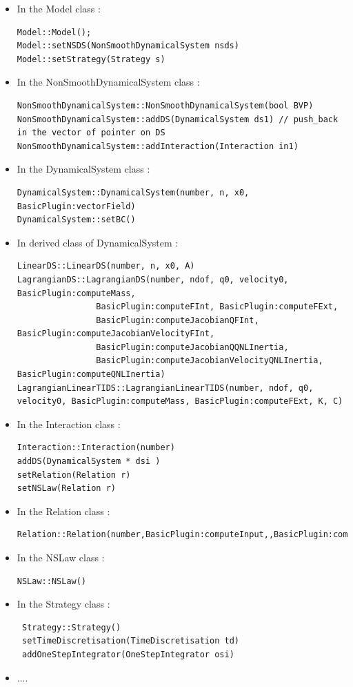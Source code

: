  \begin{itemize}
 \item In the Model class :
\begin{verbatim}
Model::Model();
Model::setNSDS(NonSmoothDynamicalSystem nsds)
Model::setStrategy(Strategy s)
\end{verbatim}
 \item In the NonSmoothDynamicalSystem class :
\begin{verbatim}
NonSmoothDynamicalSystem::NonSmoothDynamicalSystem(bool BVP)
NonSmoothDynamicalSystem::addDS(DynamicalSystem ds1) // push_back in the vector of pointer on DS
NonSmoothDynamicalSystem::addInteraction(Interaction in1) 
\end{verbatim}  
 \item In the DynamicalSystem class :
\begin{verbatim}
DynamicalSystem::DynamicalSystem(number, n, x0, BasicPlugin:vectorField)
DynamicalSystem::setBC()
\end{verbatim}
 \item In derived class of DynamicalSystem :
\begin{verbatim}
LinearDS::LinearDS(number, n, x0, A)
LagrangianDS::LagrangianDS(number, ndof, q0, velocity0, BasicPlugin:computeMass,
                BasicPlugin:computeFInt, BasicPlugin:computeFExt,
                BasicPlugin:computeJacobianQFInt, BasicPlugin:computeJacobianVelocityFInt,
                BasicPlugin:computeJacobianQQNLInertia,
                BasicPlugin:computeJacobianVelocityQNLInertia, BasicPlugin:computeQNLInertia)
LagrangianLinearTIDS::LagrangianLinearTIDS(number, ndof, q0, velocity0, BasicPlugin:computeMass, BasicPlugin:computeFExt, K, C)
\end{verbatim}

   
          \item In the Interaction class :
\begin{verbatim}
Interaction::Interaction(number)
addDS(DynamicalSystem * dsi )
setRelation(Relation r)
setNSLaw(Relation r)
\end{verbatim}
          \item In the Relation class :
\begin{verbatim}
Relation::Relation(number,BasicPlugin:computeInput,,BasicPlugin:computeOutput)
\end{verbatim}
          \item In the NSLaw class :
\begin{verbatim}
NSLaw::NSLaw()
\end{verbatim}
 \item In the Strategy class :
\begin{verbatim}
 Strategy::Strategy()
 setTimeDiscretisation(TimeDiscretisation td)
 addOneStepIntegrator(OneStepIntegrator osi) 
\end{verbatim}    
\item ....
 \end{itemize}




